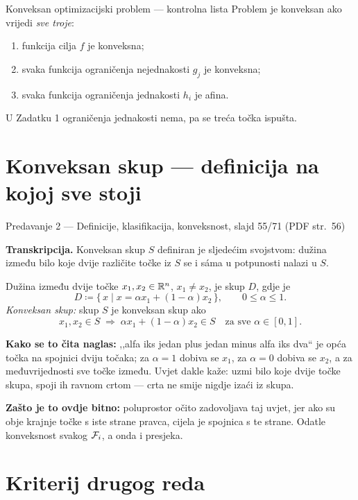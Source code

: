 \begin{pojam}{Konveksan optimizacijski problem --- kontrolna lista}
Problem je konveksan ako vrijedi \emph{sve troje}:
\begin{enumerate}[nosep,leftmargin=*]
  \item funkcija cilja $f$ je konveksna;
  \item svaka funkcija ograničenja nejednakosti $g_j$ je konveksna;
  \item svaka funkcija ograničenja jednakosti $h_i$ je afina.
\end{enumerate}
U Zadatku 1 ograničenja jednakosti nema, pa se treća točka ispušta.
\end{pojam}

\section{Konveksan skup --- definicija na kojoj sve stoji}
\label{sec:z1a-konveksan-skup}

\begin{izvor}{Predavanje 2 --- Definicije, klasifikacija, konveksnost, slajd 55/71 (PDF str.~56)}

\textbf{Transkripcija.} Konveksan skup $S$ definiran je sljedećim svojstvom:
dužina između bilo koje dvije različite točke iz $S$ se i sáma u potpunosti
nalazi u $S$.

Dužina između dvije točke $x_1, x_2 \in \mathbb{R}^n$, $x_1 \neq x_2$, je skup $D$, gdje je
\[
D \coloneqq \{\, x \mid x = \alpha x_1 + (1-\alpha)x_2 \,\}, \qquad 0 \leq \alpha \leq 1 .
\]
\emph{Konveksan skup:} skup $S$ je konveksan skup ako
\[
x_1, x_2 \in S \;\Longrightarrow\; \alpha x_1 + (1-\alpha)x_2 \in S
\quad \text{za sve } \alpha \in [0,1].
\]

\textbf{Kako se to čita naglas:} ,,alfa iks jedan plus jedan minus alfa iks dva``
je opća točka na spojnici dviju točaka; za $\alpha = 1$ dobiva se $x_1$, za
$\alpha = 0$ dobiva se $x_2$, a za međuvrijednosti sve točke između. Uvjet dakle
kaže: uzmi bilo koje dvije točke skupa, spoji ih ravnom crtom --- crta ne smije
nigdje izaći iz skupa.

\textbf{Zašto je to ovdje bitno:} poluprostor očito zadovoljava taj uvjet, jer
ako su obje krajnje točke s iste strane pravca, cijela je spojnica s te strane.
Odatle konveksnost svakog $\mathcal{F}_i$, a onda i presjeka.
\end{izvor}

\section{Kriterij drugog reda}
\label{sec:z1a-kriterij}

